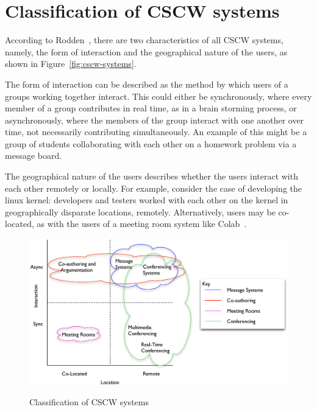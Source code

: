 
\section{Classification of CSCW systems}

According to Rodden~\cite{journals/iwc/Rodden91}, there are two
characteristics of all CSCW systems, namely, the form of interaction
and the geographical nature of the users, as shown in
Figure~\ref{fig:cscw-systems}.

The form of interaction can be described as the method by which users
of a groups working together interact. This could either be
synchronously, where every member of a group contributes in real time,
as in a brain storming process, or asynchronously, where the members
of the group interact with one another over time, not necessarily
contributing simultaneously.  An example of this might be a group of
students collaborating with each other on a homework problem via a
message board.

The geographical nature of the users describes whether the users
interact with each other remotely or locally.  For example, consider
the case of developing the linux kernel: developers and testers worked
with each other on the kernel in geographically disparate locations,
remotely.  Alternatively, users may be co-located, as with the users
of a meeting room system like Colab~\cite{Stefik:1987:BCU}.

\begin{figure}[htp]
  \label{fig:cscw-systems}
  \centering
  \includegraphics[width=140mm]{CSCWClass}
  \label{CLASS_CSCW}
  \caption{Classification of CSCW systems\cite{journals/iwc/Rodden91}}
\end{figure}

